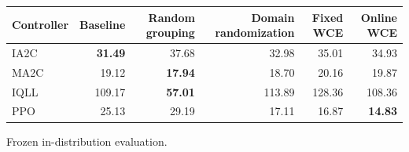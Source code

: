\begin{tabular}{lrrrrr}
\hline
Controller & Baseline & Random grouping & Domain randomization & Fixed WCE & Online WCE \\
\hline
IA2C & \textbf{31.49} & 37.68 & 32.98 & 35.01 & 34.93 \\
MA2C & 19.12 & \textbf{17.94} & 18.70 & 20.16 & 19.87 \\
IQLL & 109.17 & \textbf{57.01} & 113.89 & 128.36 & 108.36 \\
PPO & 25.13 & 29.19 & 17.11 & 16.87 & \textbf{14.83} \\
\hline
\end{tabular}
Frozen in-distribution evaluation.
